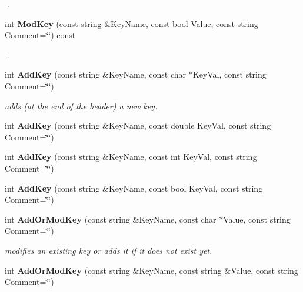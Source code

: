 \begin{CompactItemize}
\begin{CompactList}\small\item\em -.\item\end{CompactList}\item 
{}
int {\bf Mod\-Key} (const string \&Key\-Name, const bool Value, const string Comment=\char`\"{}\char`\"{}) const\label{class_fitsheader_a12}

\begin{CompactList}\small\item\em -.\item\end{CompactList}\item 
int {\bf Add\-Key} (const string \&Key\-Name, const char $\ast$Key\-Val, const string Comment=\char`\"{}\char`\"{})
\begin{CompactList}\small\item\em adds (at the end of the header) a new key.\item\end{CompactList}\item 
{}
int {\bf Add\-Key} (const string \&Key\-Name, const double Key\-Val, const string Comment=\char`\"{}\char`\"{})\label{class_fitsheader_a14}

\item 
{}
int {\bf Add\-Key} (const string \&Key\-Name, const int Key\-Val, const string Comment=\char`\"{}\char`\"{})\label{class_fitsheader_a15}

\item 
{}
int {\bf Add\-Key} (const string \&Key\-Name, const bool Key\-Val, const string Comment=\char`\"{}\char`\"{})\label{class_fitsheader_a16}

\item 
{}
int {\bf Add\-Or\-Mod\-Key} (const string \&Key\-Name, const char $\ast$Value, const string Comment=\char`\"{}\char`\"{})\label{class_fitsheader_a17}

\begin{CompactList}\small\item\em modifies an existing key or adds it if it does not exist yet.\item\end{CompactList}\item 
{}
int {\bf Add\-Or\-Mod\-Key} (const string \&Key\-Name, const string \&Value, const string Comment=\char`\"{}\char`\"{})\label{class_fitsheader_a18}


\end{CompactItemize}
